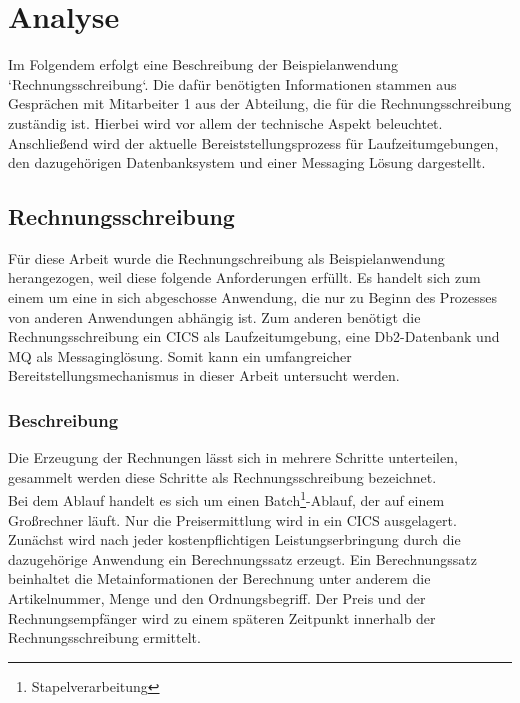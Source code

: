 \chapter{Analyse}\label{ch:analyse}
Im Folgendem erfolgt eine Beschreibung der Beispielanwendung `Rechnungsschreibung`.
Die dafür benötigten Informationen stammen aus Gesprächen mit Mitarbeiter 1 aus der Abteilung, die für die Rechnungsschreibung zuständig ist.
Hierbei wird vor allem der technische Aspekt beleuchtet.
Anschließend wird der aktuelle Bereiststellungsprozess für Laufzeitumgebungen, den dazugehörigen Datenbanksystem und einer Messaging Lösung dargestellt.

\section{Rechnungsschreibung}
Für diese Arbeit wurde die Rechnungschreibung als Beispielanwendung herangezogen, weil diese folgende Anforderungen erfüllt.
Es handelt sich zum einem um eine in sich abgeschosse Anwendung, die nur zu Beginn des Prozesses von anderen Anwendungen abhängig ist.
Zum anderen benötigt die Rechnungsschreibung ein CICS als Laufzeitumgebung, eine Db2-Datenbank und MQ als Messaginglösung.
Somit kann ein umfangreicher Bereitstellungsmechanismus in dieser Arbeit untersucht werden.

\subsection{Beschreibung}\label{rechBesch}
Die Erzeugung der Rechnungen lässt sich in mehrere Schritte unterteilen, gesammelt werden diese Schritte als Rechnungsschreibung bezeichnet.\\
Bei dem Ablauf handelt es sich um einen Batch\footnote{Stapelverarbeitung}-Ablauf, der auf einem Großrechner läuft.
Nur die Preisermittlung wird in ein CICS ausgelagert.
Zunächst wird nach jeder kostenpflichtigen Leistungserbringung durch die dazugehörige Anwendung ein Berechnungssatz erzeugt.
Ein Berechnungssatz beinhaltet die Metainformationen der Berechnung unter anderem die Artikelnummer, Menge und den Ordnungsbegriff.
Der Preis und der Rechnungsempfänger wird zu einem späteren Zeitpunkt innerhalb der Rechnungsschreibung ermittelt.

